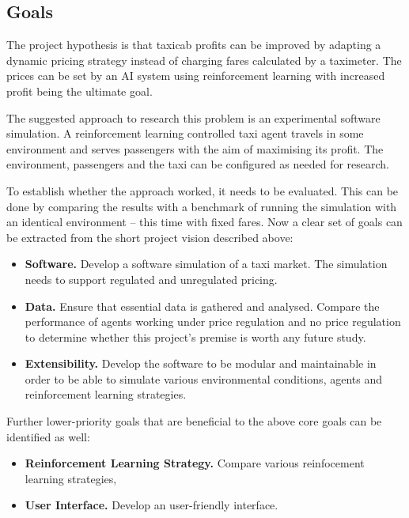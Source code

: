 \subsection{Goals}
\label{sec:intro:goals}

The project hypothesis is that taxicab profits can be improved by adapting a
dynamic pricing strategy instead of charging fares calculated by a taximeter.
The prices can be set by an AI system using reinforcement learning with
increased profit being the ultimate goal. 

The suggested approach to research this problem is an experimental software
simulation. A reinforcement learning controlled taxi agent travels in some
environment and serves passengers with the aim of maximising its profit. The
environment, passengers and the taxi can be configured as needed for research.

To establish whether the approach worked, it needs to be evaluated. This can be
done by comparing the results with a benchmark of running the simulation with an
identical environment -- this time with fixed fares.
Now a clear set of goals can be extracted from the short project vision
described above:

\begin{itemize}
  \item \textbf{Software.} Develop a software simulation of a taxi market. 
        The simulation needs to support regulated and unregulated pricing.
  \item \textbf{Data.} Ensure that essential data is gathered and analysed.
        Compare the performance of agents working under price regulation and no
        price regulation to determine whether this project's premise is worth
        any future study.
  \item \textbf{Extensibility.} Develop the software to be modular and
        maintainable in order to be able to simulate various environmental
        conditions, agents and reinforcement learning strategies.
\end{itemize}

Further lower-priority goals that are beneficial to the above core goals can be
identified as well:

\begin{itemize}
  \item \textbf{Reinforcement Learning Strategy.} Compare various reinfocement
        learning strategies,
  \item \textbf{User Interface.} Develop an user-friendly interface.
\end{itemize}
